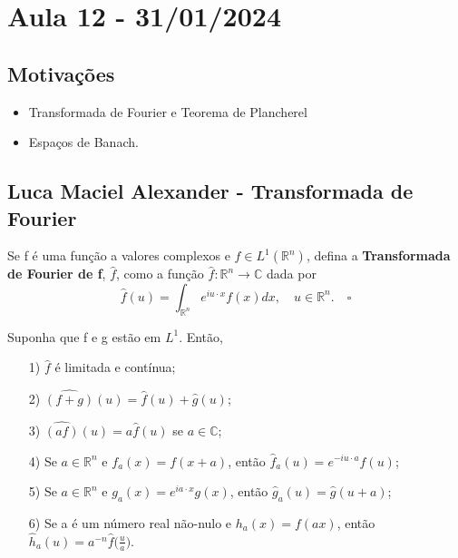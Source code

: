 \documentclass[measure_theory.tex]{subfiles}
\begin{document}
\section{Aula 12 - 31/01/2024}
\subsection{Motivações}
\begin{itemize}
	\item Transformada de Fourier e Teorema de Plancherel
	\item Espaços de Banach.
\end{itemize}
\subsection{Luca Maciel Alexander - Transformada de Fourier}
\begin{def*}
	Se f é uma função a valores complexos e \(f\in L^{1}(\mathbb{R}^{n})\), defina a \textbf{Transformada de Fourier de f}, \(\hat{f}\), como a função \(\hat{f}:\mathbb{R}^{n}\rightarrow \mathbb{C}\) dada por
	\[
		\hat{f}(u) = \int_{\mathbb{R}^{n}}^{}e^{iu \cdot x}f(x)dx,\quad u\in \mathbb{R}^{n}.\quad \square
	\]
\end{def*}
\begin{prop*}
	Suponha que f e g estão em \(L^{1}\). Então,
	\begin{itemize}
		\item[1)] \(\hat{f}\) é limitada e contínua;
		\item[2)] \(\hat{(f+g)}(u) = \hat{f}(u) + \hat{g}(u)\);
		\item[3)] \(\hat{(af)}(u) = a \hat{f}(u)\) se \(a\in \mathbb{C}\);
		\item[4)] Se \(a\in \mathbb{R}^{n}\) e \(f_{a}(x) = f(x+a)\), então \(\hat{f}_{a}(u) = e^{-iu \cdot a}\hat{f}(u)\);
		\item[5)] Se \(a\in \mathbb{R}^{n}\) e \(g_a(x) = e^{ia \cdot x}g(x)\), então \(\hat{g}_{a}(u) = \hat{g}(u+a)\);
		\item[6)] Se a é um número real não-nulo e \(h_a(x) = f(ax)\), então \(\hat{h}_{a}(u) = a^{-n}\hat{f}\biggl(\frac{u}{a}\biggr)\).
	\end{itemize}
\end{prop*}
\end{document}

